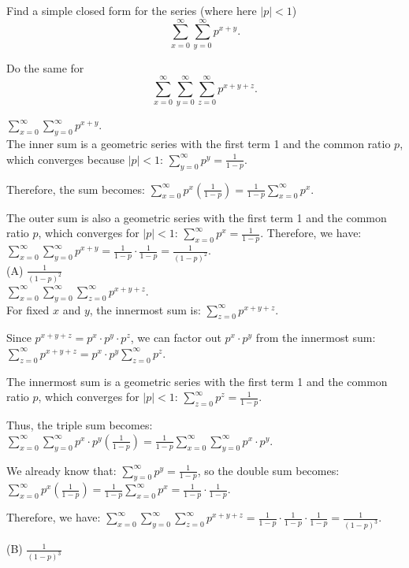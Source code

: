 \documentclass[solution,letterpaper]{cs20}
\begin{document}
    \begin{problem}
        Find a simple closed form for the series (where here $|p| < 1$)
        $$\sum\limits_{x = 0}^{\infty} \sum\limits_{y = 0}^{\infty} p^{x+y}.$$

        Do the same for
        $$\sum\limits_{x = 0}^{\infty} \sum\limits_{y = 0}^{\infty}
        \sum\limits_{z = 0}^{\infty} p^{x+y+z}.$$

        \begin{solution}

            \(\sum_{x=0}^{\infty} \sum_{y=0}^{\infty} p^{x+y}\). \\


            The inner sum is a geometric series with the first term 1 and the common ratio \( p \), which converges because \(|p| < 1\): \(\sum_{y=0}^{\infty} p^y = \frac{1}{1 - p}\).

            Therefore, the sum becomes: \(\sum_{x=0}^{\infty} p^x \left( \frac{1}{1 - p} \right) = \frac{1}{1 - p} \sum_{x=0}^{\infty} p^x\).

            The outer sum is also a geometric series with the first term 1 and the common ratio \( p \), which converges for \(|p| < 1\): \(\sum_{x=0}^{\infty} p^x = \frac{1}{1 - p}\).
            Therefore, we have: \(\sum_{x=0}^{\infty} \sum_{y=0}^{\infty} p^{x+y} = \frac{1}{1 - p} \cdot \frac{1}{1 - p} = \frac{1}{(1 - p)^2}\). \\

            (A) $\frac{1}{(1-p)^2}$ \\

            \(\sum_{x=0}^{\infty} \sum_{y=0}^{\infty} \sum_{z=0}^{\infty} p^{x+y+z}\). \\

            For fixed \( x \) and \( y \), the innermost sum is: \(\sum_{z=0}^{\infty} p^{x+y+z}\).

            Since \( p^{x+y+z} = p^x \cdot p^y \cdot p^z \), we can factor out \( p^x \cdot p^y \) from the innermost sum: \(\sum_{z=0}^{\infty} p^{x+y+z} = p^x \cdot p^y \sum_{z=0}^{\infty} p^z\).

            The innermost sum is a geometric series with the first term 1 and the common ratio \( p \), which converges for \(|p| < 1\): \(\sum_{z=0}^{\infty} p^z = \frac{1}{1 - p}\).

            Thus, the triple sum becomes: \(\sum_{x=0}^{\infty} \sum_{y=0}^{\infty} p^x \cdot p^y \left( \frac{1}{1 - p} \right) = \frac{1}{1 - p} \sum_{x=0}^{\infty} \sum_{y=0}^{\infty} p^x \cdot p^y\).

            We already know that: \(\sum_{y=0}^{\infty} p^y = \frac{1}{1 - p}\), so the double sum becomes: \(\sum_{x=0}^{\infty} p^x \left( \frac{1}{1 - p} \right) = \frac{1}{1 - p} \sum_{x=0}^{\infty} p^x = \frac{1}{1 - p} \cdot \frac{1}{1 - p}\).

            Therefore, we have: \(\sum_{x=0}^{\infty} \sum_{y=0}^{\infty} \sum_{z=0}^{\infty} p^{x+y+z} = \frac{1}{1 - p} \cdot \frac{1}{1 - p} \cdot \frac{1}{1 - p} = \frac{1}{(1 - p)^3}\).

            (B) $\frac{1}{(1-p)^3}$
        \end{solution}
    \end{problem}
    \newpage
\end{document}
